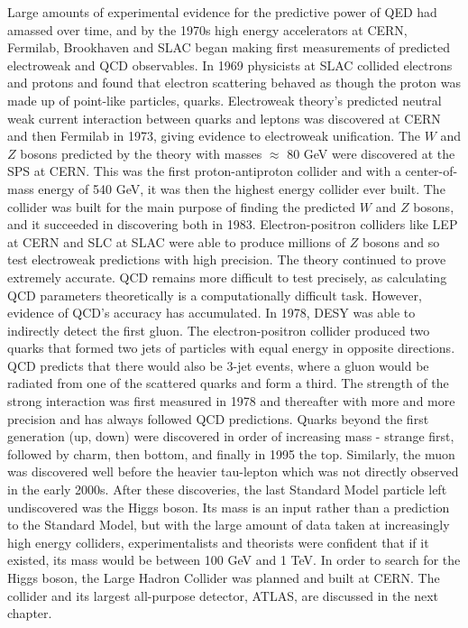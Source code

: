 Large amounts of experimental evidence for the predictive power of QED had amassed over time, and by the 1970s high energy accelerators at CERN, Fermilab, Brookhaven and SLAC began making first measurements of predicted electroweak and QCD observables. In 1969 physicists at SLAC collided electrons and protons and found that electron scattering behaved as though the proton was made up of point-like particles, quarks. Electroweak theory's predicted neutral weak current interaction between quarks and leptons was discovered at CERN and then Fermilab in 1973, giving evidence to electroweak unification. The $W$ and $Z$ bosons predicted by the theory with masses $\approx$ 80 GeV were discovered at the SPS at CERN. This was the first proton-antiproton collider and with a center-of-mass energy of 540 GeV, it was then the highest energy collider ever built. The collider was built for the main purpose of finding the predicted $W$ and $Z$ bosons, and it succeeded in discovering both in 1983. Electron-positron colliders like LEP at CERN and SLC at SLAC were able to produce millions of $Z$ bosons and so test electroweak predictions with high precision. The theory continued to prove extremely accurate. QCD remains more difficult to test precisely, as calculating QCD parameters theoretically is a computationally difficult task. However, evidence of QCD's accuracy has accumulated. In 1978, DESY was able to indirectly detect the first gluon. The electron-positron collider produced two quarks that formed two jets of particles with equal energy in opposite directions. QCD predicts that there would also be 3-jet events, where a gluon would be radiated from one of the scattered quarks and form a third. The strength of the strong interaction was first measured in 1978 and thereafter with more and more precision and has always followed QCD predictions. Quarks beyond the first generation (up, down) were discovered in order of increasing mass - strange first, followed by charm, then bottom, and finally in 1995 the top. Similarly, the muon was discovered well before the heavier tau-lepton which was not directly observed in the early 2000s. After these discoveries, the last Standard Model particle left undiscovered was the Higgs boson. Its mass is an input rather than a prediction to the Standard Model, but with the large amount of data taken at increasingly high energy colliders, experimentalists and theorists were confident that if it existed, its mass would be between 100 GeV and 1 TeV. In order to search for the Higgs boson, the Large Hadron Collider was planned and built at CERN. The collider and its largest all-purpose detector, ATLAS, are discussed in the next chapter. 

